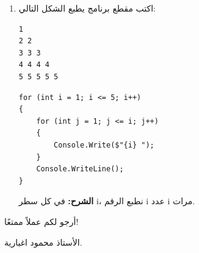 \documentclass[14pt]{extarticle}
\begin{document}
\begin{enumerate}[itemsep=2em]
    \item
    اكتب مقطع برنامج يطبع الشكل التالي:
    \begin{english}
    \begin{boxCode}
\begin{verbatim}
1
2 2
3 3 3
4 4 4 4
5 5 5 5 5
    \end{verbatim}
\end{boxCode}
    \end{english}
    \ifwithsols
    \begin{boxSolution}
    \begin{english}
    \begin{verbatim}
for (int i = 1; i <= 5; i++)
{
    for (int j = 1; j <= i; j++)
    {
        Console.Write($"{i} ");
    }
    Console.WriteLine();
}
    \end{verbatim}
    \end{english}
    \textbf{الشرح:} في كل سطر \textenglish{i}، نطبع الرقم \textenglish{i} عدد \textenglish{i} مرات.
    \end{boxSolution}
    \fi

\end{enumerate}

\vspace{1cm}
\begin{flushleft}
أرجو لكم عملاً ممتعًا!

الأستاذ محمود اغبارية.
\end{flushleft}
\end{document}
